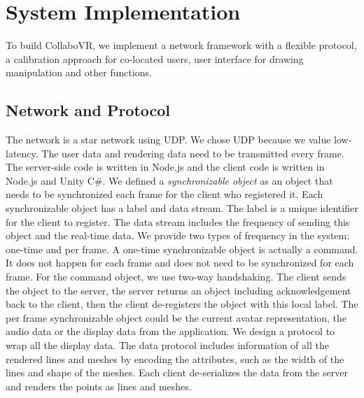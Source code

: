\documentclass{sigchi}
\begin{document}
\section{System Implementation}
To build CollaboVR, we implement a network framework with a flexible protocol, a calibration approach for co-located users, user interface for drawing manipulation and other functions.

\subsection{Network and Protocol}
The network is a star network using UDP. We chose UDP because we value low-latency. The user data and rendering data need to be transmitted every frame. The server-side code is written in Node.js and the client code is written in Node.js and Unity C\#. We defined a \textit{synchronizable object} as an object that needs to be synchronized each frame for the client who registered it. Each synchronizable object has a label and data stream. The label is a unique identifier for the client to register. The data stream includes the frequency of sending this object and the real-time data. We provide two types of frequency in the system: one-time and per frame. A one-time synchronizable object is actually a command. It does not happen for each frame and does not need to be synchronized for each frame. For the command object, we use two-way handshaking. The client sends the object to the server, the server returns an object including acknowledgement back to the client, then the client de-registers the object with this local label. The per frame synchronizable object could be the current avatar representation, the audio data or the display data from the application. We design a protocol to wrap all the display data. The data protocol includes information of all the rendered lines and meshes by encoding the attributes, such as the width of the lines and shape of the meshes. Each client de-serializes the data from the server and renders the points as lines and meshes.
\end{document}
